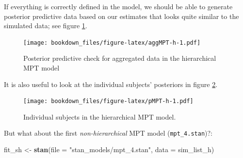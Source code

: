 \documentclass[12pt,]{krantz}
\newenvironment{Shaded}{\begin{snugshade}}{\end{snugshade}}
\newcommand{\KeywordTok}[1]{\textcolor[rgb]{0.13,0.29,0.53}{\textbf{#1}}}
\newcommand{\DataTypeTok}[1]{\textcolor[rgb]{0.13,0.29,0.53}{#1}}
\newcommand{\StringTok}[1]{\textcolor[rgb]{0.31,0.60,0.02}{#1}}
\newcommand{\OperatorTok}[1]{\textcolor[rgb]{0.81,0.36,0.00}{\textbf{#1}}}
\newcommand{\NormalTok}[1]{#1}
\theoremstyle{definition}
\theoremstyle{definition}
\theoremstyle{definition}
\theoremstyle{remark}
\begin{document}
If everything is correctly defined in the model, we should be able to
generate posterior predictive data based on our estimates that looks
quite similar to the simulated data; see figure \ref{fig:aggMPT-h}.

\begin{Shaded}
\end{Shaded}

\begin{figure}
\centering
\texttt{[image: bookdown\_files/figure-latex/aggMPT-h-1.pdf]}
\caption{\label{fig:aggMPT-h}Posterior predictive check for aggregated data
in the hierarchical MPT model}
\end{figure}

It is also useful to look at the individual subjects' posteriors in
figure \ref{fig:pMPT-h}.

\begin{Shaded}
\end{Shaded}

\begin{figure}
\centering
\texttt{[image: bookdown\_files/figure-latex/pMPT-h-1.pdf]}
\caption{\label{fig:pMPT-h}Individual subjects in the hierarchical MPT
model.}
\end{figure}

But what about the first \emph{non-hierarchical} MPT model
(\texttt{mpt\_4.stan})?:

\begin{Shaded}
\begin{Highlighting}[]
\NormalTok{fit_sh <-}\StringTok{ }\KeywordTok{stan}\NormalTok{(}\DataTypeTok{file =} \StringTok{"stan_models/mpt_4.stan"}\NormalTok{, }\DataTypeTok{data =}\NormalTok{ sim_list_h)  }
\end{Highlighting}
\end{Shaded}
\end{document}
